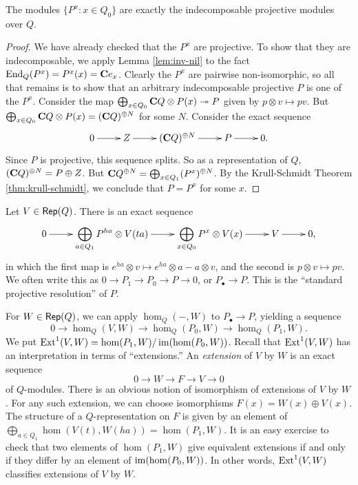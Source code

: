 \documentclass{article}
\begin{document}
\begin{proposition}
The modules $\{P^x:x\in Q_0\}$ are exactly the indecomposable projective 
modules over $Q$. 
\end{proposition}
\begin{proof}
We have already checked that the $P^x$ are projective. To show that they are 
indecomposable, we apply Lemma \ref{lem:inv-nil} to the fact 
$\operatorname{End}_Q(P^x) = P^x(x) = \mathbf{C} e_x$. Clearly the $P^x$ are pairwise 
non-isomorphic, so all that remains is to show that an arbitrary 
indecomposable projective $P$ is one of the $P^x$. Consider the map 
$\bigoplus_{x\in Q_0} \mathbf{C} Q\otimes P(x) \twoheadrightarrow P$ given by 
$p\otimes v\mapsto p v$. But 
$\bigoplus_{x\in Q_0} \mathbf{C} Q\otimes P(x) = (\mathbf{C} Q)^{\oplus N}$ for some $N$. 
Consider the exact sequence 
\[\xymatrix{
  0 \ar[r] 
    & Z \ar[r] 
    & (\dC Q)^{\oplus N} \ar[r] 
    & P \ar[r] 
    & 0 .
}\]
Since $P$ is projective, this sequence splits. So as a representation of $Q$, 
$(\mathbf{C} Q)^{\oplus N} = P\oplus Z$. But 
$\mathbf{C} Q^{\oplus N} = \bigoplus_{x\in Q_1} (P^x)^{\oplus N}$. By the Krull-Schmidt 
Theorem \ref{thm:krull-schmidt}, we conclude that $P=P^x$ for some $x$. 
\end{proof}



Let $V\in \operatorname{\mathsf{Rep}}(Q)$. There is an exact sequence 
\[\xymatrix{
  0 \ar[r] 
    & \displaystyle\bigoplus_{a\in Q_1} P^{h a} \otimes V(t a) \ar[r] 
    & \displaystyle\bigoplus_{x\in Q_0} P^x\otimes V(x) \ar[r] 
    & V \ar[r] 
    & 0 ,
}\]
in which the first map is 
$e^{h a}\otimes v\mapsto e^{ha}\otimes a  - a\otimes v$, and the second is 
$p\otimes v\mapsto p v$. We often write this as 
$0 \to P_1 \to P_0 \to P \to 0$, or $P_\bullet \to P$. This is the 
``standard projective resolution'' of $P$. 

For $W\in \operatorname{\mathsf{Rep}}(Q)$, we can apply $\hom_Q(-,W)$ to 
$P_\bullet \to P$, yielding a sequence 
\[
  0 \to \hom_Q(V,W) \to \hom_Q(P_0,W) \to \hom_Q(P_1,W) .
\]
We put $\operatorname{Ext}^1(V,W) = \hom(P_1,W) / \operatorname{im}(\hom(P_0,W))$. 
Recall that $\operatorname{Ext}^1(V,W)$ has an interpretation in terms of ``extensions.'' An 
\emph{extension} of $V$ by $W$ is an exact sequence 
\[
  0 \to W \to F \to V \to 0 
\]
of $Q$-modules. There is an obvious notion of isomorphism of extensions of 
$V$ by $W$. For any such extension, we can choose isomorphisms 
$F(x) = W(x)\oplus V(x)$. The structure of a $Q$-representation on $F$ is given 
by an element of $\bigoplus_{a\in Q_1} \hom(V(t ),W(h a)) = \hom(P_1,W)$. It is 
an easy exercise to check that two elements of $\hom(P_1,W)$ give equivalent 
extensions if and only if they differ by an element of $\operatorname{im}(\hom(P_0,W))$. 
In other words, $\operatorname{Ext}^1(V,W)$ classifies extensions of $V$ by $W$. 
\end{document}
